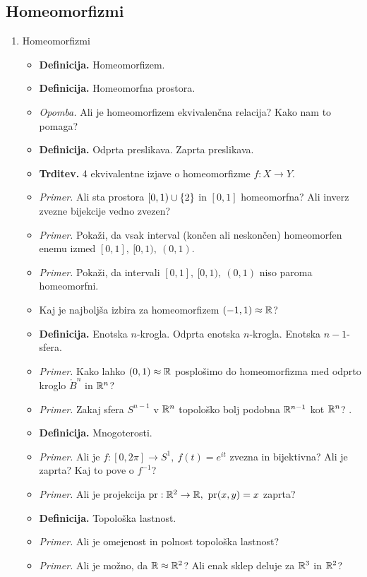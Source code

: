 \newpage
\subsection{Homeomorfizmi}
\begin{enumerate}
    \item Homeomorfizmi
    \begin{itemize}
        \item \colorbox{purple!30}{\textbf{Definicija.}} Homeomorfizem.
        \item \colorbox{purple!30}{\textbf{Definicija.}} Homeomorfna prostora.
        \item \colorbox{yellow!30}{\emph{Opomba.}} Ali je homeomorfizem ekvivalenčna relacija? Kako nam to pomaga?
        \item \colorbox{purple!30}{\textbf{Definicija.}} Odprta preslikava. Zaprta preslikava.
        \item \colorbox{blue!30}{\textbf{Trditev.}} 4 ekvivalentne izjave o homeomorfizme $f: X \to Y$.
        \item \colorbox{yellow!30}{\emph{Primer.}} Ali sta prostora $[0, 1) \cup \left\{2\right\}$ in $[0,1]$ homeomorfna? Ali inverz zvezne bijekcije vedno zvezen?
        \item \colorbox{yellow!30}{\emph{Primer.}} Pokaži, da vsak interval (končen ali neskončen) homeomorfen enemu izmed $[0,1], \ [0, 1), \ (0,1)$.
        \item \colorbox{yellow!30}{\emph{Primer.}} Pokaži, da intervali $[0,1], \ [0, 1), \ (0,1)$ niso paroma homeomorfni.
        \item Kaj je najboljša izbira za homeomorfizem $(-1, 1) \approx \mathbb{R}$?
        \item \colorbox{purple!30}{\textbf{Definicija.}} Enotska $n$-krogla. Odprta enotska $n$-krogla. Enotska $n-1$-sfera.
        \item \colorbox{yellow!30}{\emph{Primer.}} Kako lahko $(0, 1) \approx \mathbb{R}$ posplošimo do homeomorfizma med odprto kroglo $\mathring{B}^n$ in $\mathbb{R}^n$?
        \item \colorbox{yellow!30}{\emph{Primer.}} Zakaj sfera $S^{n-1}$ v $\mathbb{R}^n$ topološko bolj podobna $\mathbb{R}^{n-1}$ kot $\mathbb{R}^n$? .
        \item \colorbox{purple!30}{\textbf{Definicija.}} Mnogoterosti.
        \item \colorbox{yellow!30}{\emph{Primer.}}  Ali je $f: [0, 2 \pi] \to S^1, \ f(t) = e^{it}$ zvezna in bijektivna? Ali je zaprta? Kaj to pove o $f^{-1}$?
        \item \colorbox{yellow!30}{\emph{Primer.}} Ali je projekcija $\pr: \R^2 \to \R, \ \pr(x,y) = x$ zaprta?
        \item \colorbox{purple!30}{\textbf{Definicija.}} Topološka lastnost.
        \item \colorbox{yellow!30}{\emph{Primer.}} Ali je omejenost in polnost topološka lastnost?
        \item \colorbox{yellow!30}{\emph{Primer.}} Ali je možno, da $\mathbb{R} \approx \mathbb{R}^2$? Ali enak sklep deluje za $\mathbb{R}^3$ in $\mathbb{R}^2$?
    \end{itemize}
\end{enumerate}

